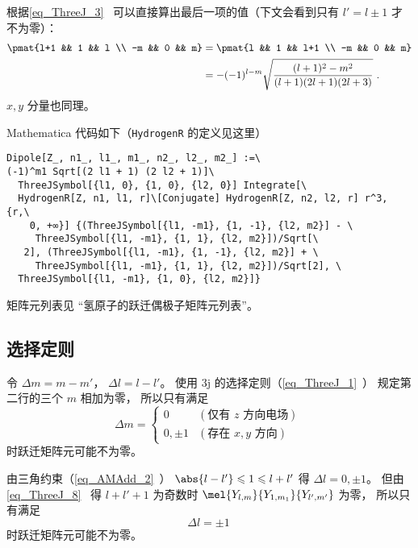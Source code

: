 根据\autoref{eq_ThreeJ_3}~ 可以直接算出最后一项的值（下文会看到只有 $l'=l\pm 1$ 才不为零）：
\begin{equation}\label{eq_SelRul_6}
\begin{aligned}
\pmat{l+1 && 1 && l \\ -m && 0 && m} &= \pmat{l && 1 && l+1 \\ -m && 0 && m}\\
&= -(-1)^{l-m} \sqrt{\frac{(l+1)^2-m^2}{(l+1)(2l+1)(2l+3)}}~.
\end{aligned}
\end{equation}
$x,y$ 分量也同理。

Mathematica 代码如下（\verb|HydrogenR| 的定义见这里）
\begin{lstlisting}[language=mma]
Dipole[Z_, n1_, l1_, m1_, n2_, l2_, m2_] :=\
(-1)^m1 Sqrt[(2 l1 + 1) (2 l2 + 1)]\
  ThreeJSymbol[{l1, 0}, {1, 0}, {l2, 0}] Integrate[\
  HydrogenR[Z, n1, l1, r]\[Conjugate] HydrogenR[Z, n2, l2, r] r^3, {r,\
    0, +∞}] {(ThreeJSymbol[{l1, -m1}, {1, -1}, {l2, m2}] - \
     ThreeJSymbol[{l1, -m1}, {1, 1}, {l2, m2}])/Sqrt[\
   2], (ThreeJSymbol[{l1, -m1}, {1, -1}, {l2, m2}] + \
     ThreeJSymbol[{l1, -m1}, {1, 1}, {l2, m2}])/Sqrt[2], \
  ThreeJSymbol[{l1, -m1}, {1, 0}, {l2, m2}]}
\end{lstlisting}
矩阵元列表见 “氢原子的跃迁偶极子矩阵元列表\upref{HDipM}”。

\subsection{选择定则}
令 $\Delta m = m - m'$， $\Delta l = l - l'$。 使用 3j 的选择定则（\autoref{eq_ThreeJ_1}~） 规定第二行的三个 $m$ 相加为零， 所以只有满足
\begin{equation}\label{eq_SelRul_4}
\Delta m =
\begin{cases}
0 & (\text{仅有 $z$ 方向电场}) \\
0, \pm 1 & (\text{存在 $x, y$ 方向})
\end{cases}~
\end{equation}
时跃迁矩阵元可能不为零。

由三角约束（\autoref{eq_AMAdd_2}~） $\abs{l-l'} \leqslant 1 \leqslant l + l'$ 得 $\Delta l = 0, \pm 1$。 但由\autoref{eq_ThreeJ_8}~ 得 $l + l' + 1$ 为奇数时 $\mel{Y_{l,m}}{Y_{1,m_1}}{Y_{l',m'}}$ 为零， 所以只有满足
\begin{equation}\label{eq_SelRul_2}
 \Delta l = \pm 1~
\end{equation}
时跃迁矩阵元可能不为零。

